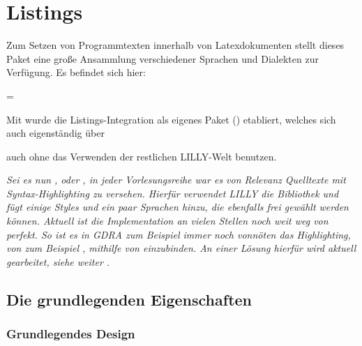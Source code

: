\renewcommand{\arraystretch}{1.5}
\setlength\intextsep{0pt}
\chapter[Listings \LILLYxBOXxVersion{\small 1.0.0}]{Listings}
\bigskip\newline
{}Zum Setzen von Programmtexten innerhalb von Latexdokumenten stellt dieses Paket eine große Ansammlung verschiedener Sprachen und Dialekten zur Verfügung. Es befindet sich hier:
\begin{center}
     = \T{\LILLYxPATHxDATA}
\end{center}

\begin{bemerkung}
    Mit  wurde die Listings-Integration als eigenes Paket () etabliert, welches sich auch eigenständig über \begin{latex}
\usepackage{LILLYxLISTINGS}
        \end{latex}
        auch ohne das Verwenden der restlichen LILLY-Welt benutzen.
\end{bemerkung}
\textit{%
Sei es nun \fg[], \eidi oder \gdra[], in jeder Vorlesungsreihe war es von Relevanz Quelltexte mit Syntax-Highlighting zu versehen. Hierfür verwendet LILLY die Bibliothek  und fügt einige Styles und ein paar Sprachen hinzu, die ebenfalls frei gewählt werden können. Aktuell ist die Implementation an vielen Stellen noch weit weg von perfekt. So ist es in GDRA zum Beispiel immer noch vonnöten das Highlighting, von zum Beispiel , mithilfe von einzubinden. An einer Lösung hierfür wird aktuell gearbeitet, siehe weiter .}

\section{Die grundlegenden Eigenschaften}
\subsection{Grundlegendes Design}


